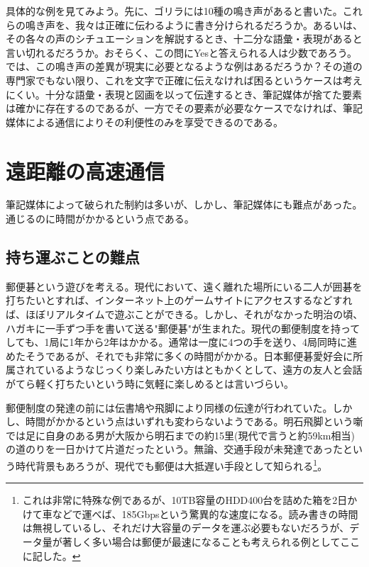 具体的な例を見てみよう。先に、ゴリラには10種の鳴き声があると書いた。これらの鳴き声を、我々は正確に伝わるように書き分けられるだろうか。あるいは、その各々の声のシチュエーションを解説するとき、十二分な語彙・表現があると言い切れるだろうか。おそらく、この問にYesと答えられる人は少数であろう。では、この鳴き声の差異が現実に必要となるような例はあるだろうか？その道の専門家でもない限り、これを文字で正確に伝えなければ困るというケースは考えにくい。十分な語彙・表現と図画を以って伝達するとき、筆記媒体が捨てた要素は確かに存在するのであるが、一方でその要素が必要なケースでなければ、筆記媒体による通信によりその利便性のみを享受できるのである。



\section{遠距離の高速通信}

筆記媒体によって破られた制約は多いが、しかし、筆記媒体にも難点があった。通じるのに時間がかかるという点である。

\subsection{持ち運ぶことの難点}

郵便碁という遊びを考える。現代において、遠く離れた場所にいる二人が囲碁を打ちたいとすれば、インターネット上のゲームサイトにアクセスするなどすれば、ほぼリアルタイムで遊ぶことができる。しかし、それがなかった明治の頃、ハガキに一手ずつ手を書いて送る"郵便碁"が生まれた。現代の郵便制度を持ってしても、1局に1年から2年はかかる。通常は一度に4つの手を送り、4局同時に進めたそうであるが、それでも非常に多くの時間がかかる。日本郵便碁愛好会に所属されているようなじっくり楽しみたい方はともかくとして、遠方の友人と会話がてら軽く打ちたいという時に気軽に楽しめるとは言いづらい。

郵便制度の発達の前には伝書鳩や飛脚により同様の伝達が行われていた。しかし、時間がかかるという点はいずれも変わらないようである。明石飛脚という噺では足に自身のある男が大阪から明石までの約15里(現代で言うと約59km相当)の道のりを一日かけて片道だったという。無論、交通手段が未発達であったという時代背景もあろうが、現代でも郵便は大抵遅い手段として知られる\footnote{これは非常に特殊な例であるが、10TB容量のHDD400台を詰めた箱を2日かけて車などで運べば、185Gbpsという驚異的な速度になる。読み書きの時間は無視しているし、それだけ大容量のデータを運ぶ必要もないだろうが、データ量が著しく多い場合は郵便が最速になることも考えられる例としてここに記した。}。

